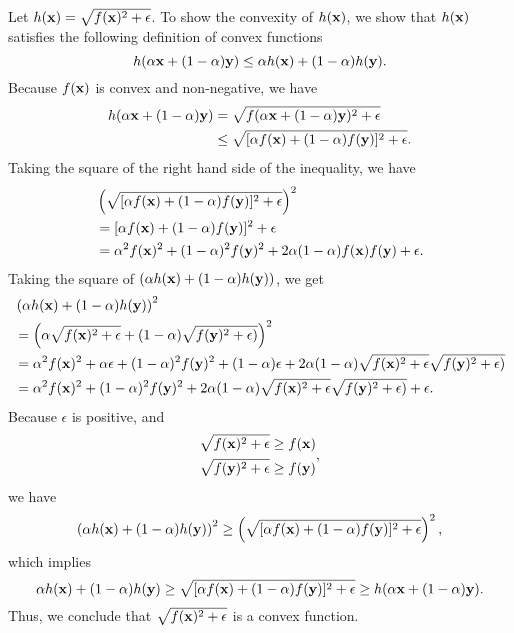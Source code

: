 \documentclass{scrartcl}
\begin{document}
Let $h(\mathbf{x}) = \sqrt{f(\mathbf{x})^2+\epsilon}$. To show the convexity of
$h(\mathbf{x})$, we show that $h(\mathbf{x})$ satisfies the following definition of convex functions
\begin{equation}
	h(\alpha \mathbf{x}+(1-\alpha)\mathbf{y})
	\le \alpha h(\mathbf{x}) + (1-\alpha) h(\mathbf{y}) .
\end{equation}
Because $f(\mathbf{x})$ is convex and non-negative, we have
\begin{equation}
\begin{split}
h(\alpha \mathbf{x}+(1-\alpha)\mathbf{y}) &  = \sqrt{f(\alpha \mathbf{x}+(1-\alpha)\mathbf{y})^2+\epsilon} \\
& \le \sqrt{[\alpha f(\mathbf{x})+(1-\alpha)f(\mathbf{y})]^2+\epsilon} .
\end{split}
\end{equation}
Taking the square of the right hand side of the inequality, we have
\begin{equation}
\begin{split}
& \left( \sqrt{[\alpha f(\mathbf{x})+(1-\alpha)f(\mathbf{y})]^2+\epsilon} \right) ^2 \\
& = [\alpha f(\mathbf{x})+(1-\alpha)f(\mathbf{y})]^2+\epsilon \\
& = \alpha^2 f(\mathbf{x})^2 + (1-\alpha)^2 f(\mathbf{y})^2 
    + 2\alpha(1-\alpha)f(\mathbf{x})f(\mathbf{y})+\epsilon .
\end{split}
\end{equation}
Taking the square of $(\alpha h(\mathbf{x}) + (1-\alpha) h(\mathbf{y}))$, we get
\begin{equation}
	\begin{split}
	& \left( \alpha h(\mathbf{x}) + (1-\alpha) h(\mathbf{y}) \right)^2 \\
	& = \left( \alpha \sqrt{f(\mathbf{x})^2+\epsilon}
	    + (1-\alpha) \sqrt{f(\mathbf{y})^2+\epsilon)} \right)^2 \\
	& = \alpha^2 f(\mathbf{x})^2 + \alpha \epsilon + (1-\alpha)^2 f(\mathbf{y})^2 + (1-\alpha) \epsilon
	    + 2 \alpha (1-\alpha) \sqrt{f(\mathbf{x})^2+\epsilon} \sqrt{f(\mathbf{y})^2+\epsilon)} \\
	& = \alpha^2 f(\mathbf{x})^2 + (1-\alpha)^2 f(\mathbf{y})^2
	    + 2 \alpha (1-\alpha) \sqrt{f(\mathbf{x})^2+\epsilon} \sqrt{f(\mathbf{y})^2+\epsilon)} + \epsilon .
	\end{split}
\end{equation}
Because $\epsilon$ is positive, and
\begin{equation}
\begin{split}
\sqrt{f(\mathbf{x})^2+\epsilon} & \ge f(\mathbf{x}) \\
\sqrt{f(\mathbf{y})^2+\epsilon} & \ge f(\mathbf{y}) 
\end{split} ,
\end{equation}
we have 
\begin{equation}
\left( \alpha h(\mathbf{x}) + (1-\alpha) h(\mathbf{y}) \right)^2
\ge \left( \sqrt{[\alpha f(\mathbf{x})+(1-\alpha)f(\mathbf{y})]^2+\epsilon} \right) ^2 ,
\end{equation}
which implies
\begin{equation}
\alpha h(\mathbf{x}) + (1-\alpha) h(\mathbf{y})
\ge \sqrt{[\alpha f(\mathbf{x})+(1-\alpha)f(\mathbf{y})]^2+\epsilon}
\ge h(\alpha \mathbf{x}+(1-\alpha)\mathbf{y}) .
\end{equation}
Thus, we conclude that $\sqrt{f(\mathbf{x})^2+\epsilon}$ is a convex function.
\end{document}
